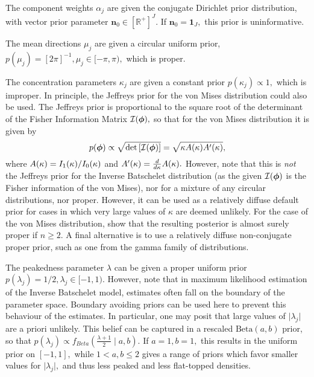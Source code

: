 The component weights \(\alpha_j\) are given the conjugate Dirichlet prior distribution, with vector prior parameter \(\boldsymbol{n}_0 \in \left[\mathbb{R}^+\right]^{J}.\) If \(\boldsymbol{n}_0 = \boldsymbol{1}_J,\) this prior is uninformative.

The mean directions \(\mu_j\) are given a circular uniform prior, \(p(\mu_j) = [2\pi]^{-1}, \mu_j \in [-\pi, \pi),\) which is proper.

The concentration parameters \(\kappa_j\) are given a constant prior \(p(\kappa_j) \propto 1,\) which is improper. In principle, the Jeffreys prior for the von Mises distribution could also be used. The Jeffreys prior is proportional to the square root of the determinant of the Fisher Information Matrix \( \mathcal{I}(\boldsymbol{\phi}),\) so that for the von Mises distribution it is given by
\begin{equation}
  p(\boldsymbol{\phi}) \propto \sqrt{ \text{det}\left[ \mathcal{I}(\boldsymbol{\phi}) \right] } = \sqrt{\kappa A(\kappa) A'(\kappa) },
\end{equation}
where \( A(\kappa) = I_1(\kappa) / I_0(\kappa) \) and \( A'(\kappa) = \frac{d}{d \kappa} A(\kappa).\) However, note that this is \textit{not} the Jeffreys prior for the Inverse Batschelet distribution (as the given $\mathcal{I}(\boldsymbol{\phi})$ is the Fisher information of the von Mises), nor for a mixture of any circular distributions, nor proper. However, it can be used as a relatively diffuse default prior for cases in which very large values of \(\kappa\) are deemed unlikely. For the case of the von Mises distribution, \citet{hornik2013conjugate} show that the resulting posterior is almost surely proper if \(n \geq 2.\) A final alternative is to use a relatively diffuse non-conjugate proper prior, such as one from the gamma family of distributions.

The peakedness parameter \(\lambda\) can be given a proper uniform prior \(p(\lambda_j) = 1/2, \lambda_j \in [-1, 1).\) However, \citet{jones2012inverse} note that in maximum likelihood estimation of the Inverse Batschelet model, estimates often fall on the boundary of the parameter space. Boundary avoiding priors can be used here to prevent this behaviour of the estimates. In particular, one may posit that large values of \(\vert \lambda_j \vert\) are a priori unlikely. This belief can be captured in a rescaled \(\text{Beta}(a, b)\) prior, so that \(p(\lambda_j) \propto f_{Beta} \left(\frac{\lambda + 1}{2} \mid a, b\right).\) If \(a = 1, b = 1, \) this results in the uniform prior on \([-1, 1],\) while \(1 < a, b \leq 2\) gives a range of priors which favor smaller values for  \(\vert \lambda_j \vert,\) and thus less peaked and less flat-topped densities.


